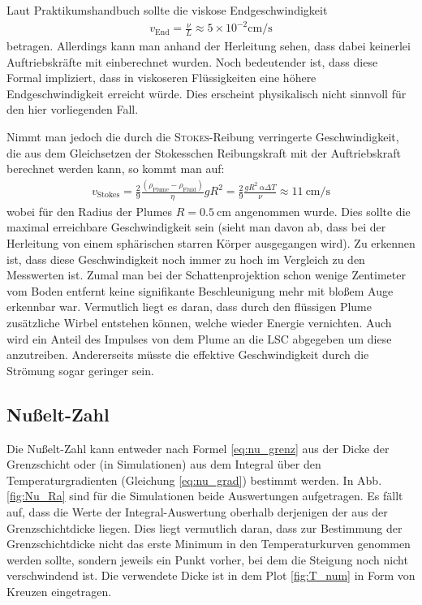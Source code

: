 \documentclass[12pt,a4paper,titlepage,headinclude]{scrartcl}
\numberwithin{equation}{subsection}
\begin{document}
Laut Praktikumshandbuch sollte die viskose Endgeschwindigkeit
\begin{align*}
  v_\text{End} = \frac{\nu}{L}\approx5\times10^{-2}\si{\centi\meter\per\second}
\end{align*}
betragen.
Allerdings kann man anhand der Herleitung sehen, dass dabei keinerlei Auftriebskräfte mit einberechnet wurden.
Noch bedeutender ist, dass diese Formal impliziert, dass in viskoseren Flüssigkeiten eine höhere Endgeschwindigkeit erreicht würde.
Dies erscheint physikalisch nicht sinnvoll für den hier vorliegenden Fall.


Nimmt man jedoch die durch die \textsc{Stokes}-Reibung verringerte Geschwindigkeit, die aus dem Gleichsetzen der Stokesschen Reibungskraft mit der Auftriebskraft berechnet werden kann, so kommt man auf:
\begin{align*}
  v_\text{Stokes} = \frac{2}{9}\frac{\left( \rho_\text{Plume}-\rho_\text{Fluid} \right)}{\eta}gR^2=\frac{2}{9}\frac{gR^2~\alpha\Delta T}{\nu}\approx\SI{11}{\centi\meter\per\second}
\end{align*}
wobei für den Radius der Plumes $R=\SI{0.5}{\centi\meter}$ angenommen wurde.
Dies sollte die maximal erreichbare Geschwindigkeit sein (sieht man davon ab, dass bei der Herleitung von einem sphärischen starren Körper ausgegangen wird).
Zu erkennen ist, dass diese Geschwindigkeit noch immer zu hoch im Vergleich zu den Messwerten ist.
Zumal man bei der Schattenprojektion schon wenige Zentimeter vom Boden entfernt keine signifikante Beschleunigung mehr mit bloßem Auge erkennbar war.
Vermutlich liegt es daran, dass durch den flüssigen Plume zusätzliche Wirbel entstehen können, welche wieder Energie vernichten.
Auch wird ein Anteil des Impulses von dem Plume an die LSC abgegeben um diese anzutreiben.
Andererseits müsste die effektive Geschwindigkeit durch die Strömung sogar geringer sein.


\subsection{Nußelt-Zahl}
\label{sec:nusselt}
Die Nußelt-Zahl kann entweder nach Formel \ref{eq:nu_grenz} aus der Dicke der Grenzschicht oder (in Simulationen) aus dem Integral über den Temperaturgradienten (Gleichung \ref{eq:nu_grad}) bestimmt werden.
In Abb. \ref{fig:Nu_Ra} sind für die Simulationen beide Auswertungen aufgetragen.
Es fällt auf, dass die Werte der Integral-Auswertung oberhalb derjenigen der aus der Grenzschichtdicke liegen.
Dies liegt vermutlich daran, dass zur Bestimmung der Grenzschichtdicke nicht das erste Minimum in den Temperaturkurven genommen werden sollte, sondern jeweils ein Punkt vorher, bei dem die Steigung noch nicht verschwindend ist.
Die verwendete Dicke ist in dem Plot \ref{fig:T_num} in Form von Kreuzen eingetragen.
\end{document}
